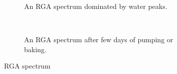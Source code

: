 \begin{figure}[!ht]
  \begin{subfigure}{0.5\textwidth}
    
    \caption{An RGA spectrum dominated by water peaks.}
    \label{}
  \end{subfigure}
  ~
  \begin{subfigure}{0.5\textwidth}
    
    \caption{An RGA spectrum after few days of pumping or baking.}
    \label{}
  \end{subfigure}
  \caption[]{RGA spectrum}
  \label{chap4:vacuum_rga}
\end{figure}
